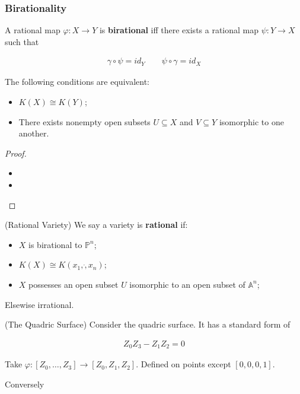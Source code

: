 \documentclass[Total.tex]{subfiles}
\begin{document}
		\subsubsection{Birationality}
		
		\begin{Def}
			A rational map $\varphi:X\rightarrow Y$ is \textbf{birational} iff there exists a rational map $\psi:Y\rightarrow X$ such that 
			
			\begin{gather*}
				\gamma\circ \psi=id_Y\qquad \psi\circ \gamma=id_X
			\end{gather*}
		\end{Def}
		
		\begin{theorem}
			The following conditions are equivalent:
			
			\begin{itemize}
				\item $K(X)\cong K(Y)$;
				
				\item There exists nonempty open subsets $U\subseteq X$ and $V\subseteq Y$ isomorphic to one another.
			\end{itemize}
		\end{theorem}
		
		\begin{proof}
			\begin{itemize}
				\item 
				\item 
			\end{itemize}
		\end{proof}
		
		\begin{Def}
			(Rational Variety) We say a variety is \textbf{rational} if:
			
			\begin{itemize}
				\item $X$ is birational to $\mathbb{P}^n$;
				\item $K(X)\cong K(x_1,\dot,x_n)$;
				\item $X$ possesses an open subset $U$ isomorphic to an open subset of $\mathbb{A}^n$;
			\end{itemize}
			
			Elsewise irrational.
		\end{Def}
		
		\begin{example}
			(The Quadric Surface) Consider the quadric surface. It has a standard form of 
			
			\begin{gather*}
				Z_0Z_3-Z_1Z_2=0
			\end{gather*}
			
			Take $\varphi:[Z_0,\dots,Z_3]\rightarrow [Z_0,Z_1,Z_2]$. Defined on points except $[0,0,0,1]$. 
			
			Conversely
			
			
		\end{example}
		
\end{document}
